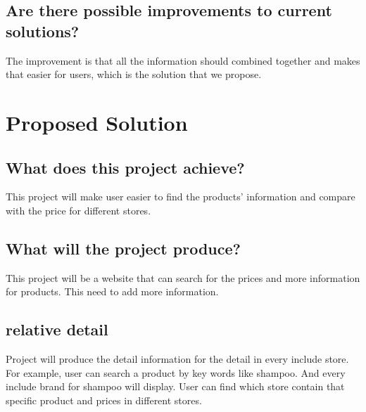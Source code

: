 \documentclass[12pt]{article}
\begin{document}
\subsection*{Are there possible improvements to current solutions?}
The improvement is that all the information should combined together and makes that easier for users, which is the solution that we propose.

\section*{Proposed Solution}
\subsection*{What does this project achieve?}
This project will make user easier to find the products' information and compare with the price for different stores.

\subsection*{What will the project produce?}
This project will be a website that can search for the prices and more information for products.
\color{red}
This need to add more information.
\color{black}
\subsection*{relative detail}
Project will produce the detail information for the detail in every include store. For example, user can search a product by key words like shampoo. And every include brand for shampoo will display. User can find which store contain that specific product and prices in different stores.
\end{document}
